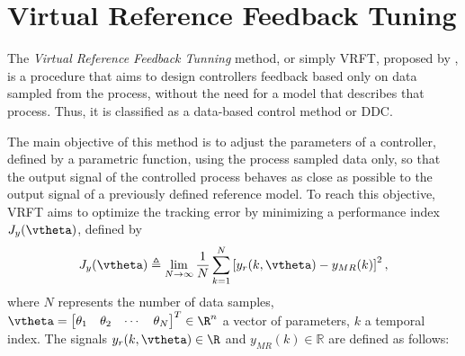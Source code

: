 \chapter{Virtual Reference Feedback Tuning}\label{cap:vrft}
\vspace{-1cm}



The \textit{Virtual Reference Feedback Tunning} method, or simply VRFT, proposed by \cite{campi2002b}, is a procedure that aims to design controllers feedback based only on data sampled from the process, without the need for a model that describes that process. Thus, it is classified as a data-based control method or DDC.

The main objective of this method is to adjust the parameters of a controller, defined by a parametric function, using the process sampled data only, so that the output signal of the controlled process behaves as close as possible to the output signal of a previously defined reference model.
To reach this objective, VRFT aims to optimize the tracking error by minimizing a performance index $J_y(\vtheta)$, defined by
\begin{equation}
    J_y(\vtheta) \triangleq \lim_{N \to \infty}  \frac{1}{N} \sum_{k=1}^N \left[y_r(k,\vtheta) - y_{MR}(k)\right]^2
\label{eq:Jy},
\end{equation}
where $N$ represents the number of data samples, $\vtheta = \begin{bmatrix} \theta_1 & \theta_2 & \cdots & \theta_N \end{bmatrix}^T \in \R^n$ a vector of parameters, $k$ a temporal index. The signals $y_r(k,\vtheta) \in \R $ and $y_{MR}(k) \in \mathbb{R}$ are defined as follows:


